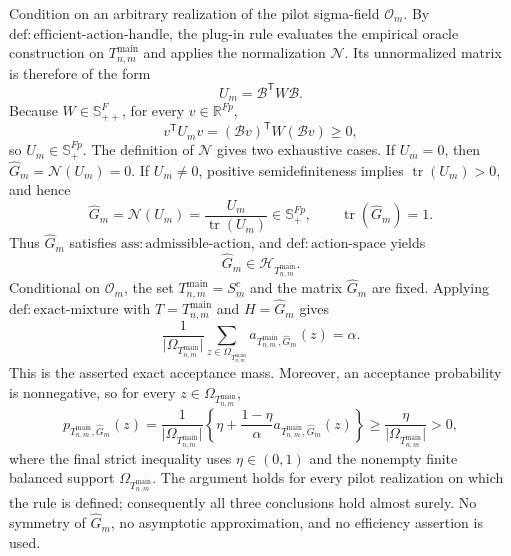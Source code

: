 Condition on an arbitrary realization of the pilot sigma-field \(\mathcal O_m\).  By \(\mathrm{def{:}efficient\text{-}action\text{-}handle}\), the plug-in rule evaluates the empirical oracle construction on \(T_{n,m}^{\mathrm{main}}\) and applies the normalization \(\mathcal N\).  Its unnormalized matrix is therefore of the form
\[
U_m=\mathcal B^{\mathsf T}W\mathcal B.
\]
Because \(W\in\mathbb S_{++}^{F}\), for every \(v\in\mathbb R^{Fp}\),
\[
v^{\mathsf T}U_m v=(\mathcal Bv)^{\mathsf T}W(\mathcal Bv)\geq 0,
\]
so \(U_m\in\mathbb S_{+}^{Fp}\).  The definition of \(\mathcal N\) gives two exhaustive cases.  If \(U_m=0\), then \(\widehat G_m=\mathcal N(U_m)=0\).  If \(U_m\neq0\), positive semidefiniteness implies \(\operatorname{tr}(U_m)>0\), and hence
\[
\widehat G_m=\mathcal N(U_m)=\frac{U_m}{\operatorname{tr}(U_m)}\in\mathbb S_{+}^{Fp},
\qquad
\operatorname{tr}(\widehat G_m)=1.
\]
Thus \(\widehat G_m\) satisfies \(\mathrm{ass{:}admissible\text{-}action}\), and \(\mathrm{def{:}action\text{-}space}\) yields
\[
\widehat G_m\in\mathcal H_{T_{n,m}^{\mathrm{main}}}.
\]
Conditional on \(\mathcal O_m\), the set \(T_{n,m}^{\mathrm{main}}=S_m^c\) and the matrix \(\widehat G_m\) are fixed.  Applying \(\mathrm{def{:}exact\text{-}mixture}\) with \(T=T_{n,m}^{\mathrm{main}}\) and \(H=\widehat G_m\) gives
\[
\frac{1}{\lvert\Omega_{T_{n,m}^{\mathrm{main}}}\rvert}
\sum_{z\in\Omega_{T_{n,m}^{\mathrm{main}}}}
a_{T_{n,m}^{\mathrm{main}},\widehat G_m}(z)=\alpha.
\]
This is the asserted exact acceptance mass.  Moreover, an acceptance probability is nonnegative, so for every \(z\in\Omega_{T_{n,m}^{\mathrm{main}}}\),
\[
p_{T_{n,m}^{\mathrm{main}},\widehat G_m}(z)
=\frac{1}{\lvert\Omega_{T_{n,m}^{\mathrm{main}}}\rvert}
\left\{\eta+\frac{1-\eta}{\alpha}
a_{T_{n,m}^{\mathrm{main}},\widehat G_m}(z)\right\}
\geq\frac{\eta}{\lvert\Omega_{T_{n,m}^{\mathrm{main}}}\rvert}>0,
\]
where the final strict inequality uses \(\eta\in(0,1)\) and the nonempty finite balanced support \(\Omega_{T_{n,m}^{\mathrm{main}}}\).  The argument holds for every pilot realization on which the rule is defined; consequently all three conclusions hold almost surely.  No symmetry of \(\widehat G_m\), no asymptotic approximation, and no efficiency assertion is used.
